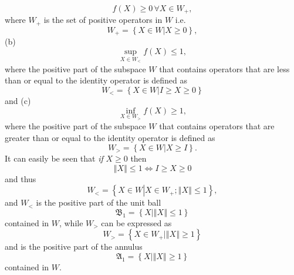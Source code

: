 \documentclass[aps,preprint,amsfonts,amssymb,showpacs,showkeys]{revtex4}%
\begin{document}
\begin{equation}
f\left(  X\right)  \geq0\,\forall X\in W_{+}, \label{Positivity}%
\end{equation}
where $W_{+}$ is the set of positive operators in $W$ i.e.
\begin{equation}
W_{+}=\left\{  X\in W\left\vert X\geq0\right.  \right\}  ,
\end{equation}
(b)%
\begin{equation}
\sup_{X\in W_{<}}f\left(  X\right)  \leq1, \label{Supcond}%
\end{equation}
where the positive part of the subspace $W$ that contains operators that are
less than or equal to the identity operator is defined as
\begin{equation}
W_{<}=\left\{  X\in W\left\vert I\geq X\geq0\right.  \right\}
\end{equation}
and (c)
\begin{equation}
\inf_{X\in W_{>}}f\left(  X\right)  \geq1, \label{Infcond}%
\end{equation}
where the positive part of the subspace $W$ that contains operators that are
greater than or equal to the identity operator is defined as
\begin{equation}
W_{>}=\left\{  X\in W\left\vert X\geq I\right.  \right\}  .
\end{equation}
It can easily be seen that \emph{if} $X\geq0$ then
\begin{equation}
\left\Vert X\right\Vert \leq1\Leftrightarrow I\geq X\geq0
\end{equation}
and thus
\begin{equation}
W_{<}=\left\{  X\in W\left\vert X\in W_{+};\left\Vert X\right\Vert
\leq1\right.  \right\}  ,
\end{equation}
and $W_{<}$ is the positive part of the unit ball
\begin{equation}
\mathfrak{B}_{1}=\left\{  X\left\vert \left\Vert X\right\Vert \leq1\right.
\right\}
\end{equation}
contained in $W$, while $W_{>}$ can be expressed as
\begin{equation}
W_{>}=\left\{  X\in W_{+}\left\vert \left\Vert X\right\Vert \geq1\right.
\right\}
\end{equation}
and is the positive part of the annulus%
\begin{equation}
\mathfrak{A}_{1}=\left\{  X\left\vert \left\Vert X\right\Vert \geq1\right.
\right\}
\end{equation}
contained in $W.$
\end{document}
